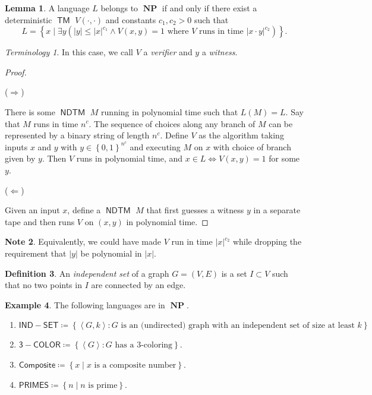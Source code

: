 \documentclass[10pt,letterpaper,cm]{nupset}
\theoremstyle{definition}
\newtheorem{definition}{Definition}[subsection]
\newtheorem{exmp}[definition]{Example}
\newtheorem{note}[definition]{Note}
\theoremstyle{theorem}
\newtheorem{lemma}[definition]{Lemma}
\theoremstyle{remark}
\newtheorem*{term}{Terminology}
\newcommand{\1}{\mathbf{1}}
\newcommand{\0}{\vec 0}
\DeclareMathOperator{\TM}{\mathsf{TM}}
\DeclareMathOperator{\NP}{\mathbf{NP}}
\DeclareMathOperator{\NDTM}{\mathsf{NDTM}}
\begin{document}
\begin{lemma}
A language $L$  belongs to $\NP$ if and only if there exist  a deterministic $\TM$ $V(\cdot, \cdot)$ and constants $c_1, c_2 >0$ such that $$L = \left\{ x \mid \exists y\left(\left\lvert{y}\right\rvert \leq \left\lvert{x}\right\rvert^{c_1} \land V\left(x,y\right) = 1 \text{ where } V \text{ runs in time }\left\lvert{x\cdot y}\right\rvert^{c_2}\right)\right\}.$$ 
\end{lemma}
\begin{term}
In this case, we call $V$ a \textit{verifier} and $y$ a \textit{witness}.
\end{term}
\begin{proof} $ $

($\Longrightarrow$) 

\smallskip

There is some $\NDTM$ $M$ running in polynomial time such that $L(M) = L$. Say that $M$ runs in time $n^c$. The sequence of choices along any branch of $M$ can be represented by a binary string of length $n^c$.
Define $V$ as the algorithm taking inputs $x$ and $y$ with $y\in  \left\{0,1\right\}^{n^c}$ and executing $M$ on $x$ with choice of branch given by $y$. Then $V$ runs in polynomial time, and $x\in L \iff V\left(x,y\right) =1$ for some $y$.

\medskip


($\Longleftarrow$)  

\smallskip

Given an input $x$, define a $\NDTM$ $M$ that first guesses a witness $y$ in a separate tape and then runs $V$ on $\left(x,y\right)$ in polynomial time. 
\end{proof}

\begin{note}
Equivalently, we could have made $V$ run in time $\left\lvert{x}\right\rvert^{c_2}$ while dropping the requirement that $\left\lvert{y}\right\rvert$ be polynomial in $\left\lvert{x}\right\rvert$. 
\end{note}

\begin{definition}
An \textit{independent set} of a graph $G=\left(V, E\right)$ is a set $I\subset V$ such that no two points in $I$ are connected by an edge. 
\end{definition}

\begin{exmp} The following languages are in $\NP$.
\begin{enumerate}
\item $\mathsf{IND{-}SET} \coloneqq \left\{\left\langle G, k \right\rangle : G\text{ is an (undirected) graph with an independent set of size at least }k\right\}$
\item $\mathsf{3{-}COLOR}\coloneqq \left\{ \left\langle G \right\rangle : G\text{ has a }3\text{-coloring}\right\}$.
\item $\mathsf{Composite} \coloneqq \left\{x \mid x\text{ is a composite number}\right\}$.
\item $\mathsf{PRIMES}\coloneqq \left\{ n \mid n\text{ is prime}\right\}$.
\end{enumerate}
\end{exmp}
\end{document}
